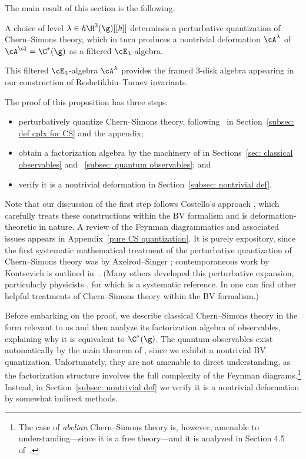 \documentclass[10pt]{amsart}
\begin{document}
The main result of this section is the following.

\begin{prp}
A choice of level $\lambda \in \hbar \H^3(\g)[[\hbar]]$ determines a perturbative quantization of Chern--Simons theory,
which in turn produces a nontrivial deformation $\cA^\lambda$ of $\cA^\cl = \C^*(\g)$ as a filtered $\cE_3$-algebra.
\end{prp}

This filtered $\cE_3$-algebra $\cA^\lambda$ provides the framed 3-disk algebra 
appearing in our construction of Reshetikhin--Turaev invariants.

The proof of this proposition has three steps:
\begin{itemize}
\item perturbatively quantize Chern--Simons theory, following~\cite{CosBook} in Section~\ref{subsec: def cplx for CS} and the appendix;
\item obtain a factorization algebra by the machinery of \cite{CG1,CG2} in Sections~\ref{sec: classical observables} and ~\ref{subsec: quantum observables}; and
\item verify it is a nontrivial deformation in Section~\ref{subsec: nontrivial def}.
\end{itemize}
Note that our discussion of the first step follows Costello's approach \cite{CosCS, CosBook},
which carefully treats these constructions within the BV formalism and is deformation-theoretic in nature.
A review of the Feynman diagrammatics and associated issues appears in Appendix~\ref{pure CS quantization}.
It is purely expository, 
since the first systematic mathematical treatment of the perturbative quantization of Chern--Simons theory was by Axelrod--Singer \cite{AxeSinI,AxeSinII};
contemporaneous work by Kontsevich is outlined in~\cite{KonECM}.
(Many others developed this perturbative expansion, particularly physicists \cite{GMM},
for which \cite{GuaBook} is a systematic reference. 
In \cite{IacCS, CatMne} one can find other helpful treatments of Chern--Simons theory within the BV formalism.) 

Before embarking on the proof, we describe classical Chern--Simons theory in the form relevant to us
and then analyze its factorization algebra of observables,
explaining why it is equivalent to $\C^*(\g)$.
The quantum observables exist automatically by the main theorem of \cite{CG2},
since we exhibit a nontrivial BV quantization.
Unfortunately, they are not amenable to direct understanding,
as the factorization structure involves the full complexity of the Feynman diagrams.\footnote{The case of {\em abelian} Chern--Simons theory is, however,
amenable to understanding---since it is a free theory---and 
it is analyzed in Section 4.5 of~\cite{CG1}.}
Instead, in Section~\ref{subsec: nontrivial def} 
we verify it is a nontrivial deformation by somewhat indirect methods.
\end{document}
